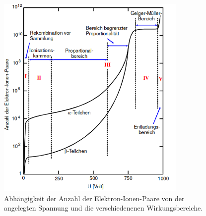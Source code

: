 \begin{figure}[h]
    \centering
    \includegraphics[height=10cm]{Theorie/wirkung.png}
    \caption{Abhängigkeit der Anzahl der Elektron-Ionen-Paare von der angelegten Spannung und die verschiedenenen Wirkungsbereiche.}
    \label{fig:wirkung}
\end{figure}

